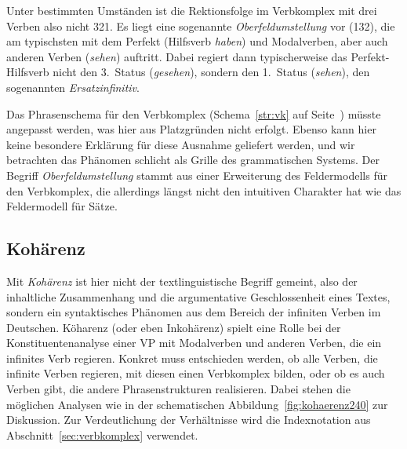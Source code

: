 Unter bestimmten Umständen ist die Rektionsfolge im Verbkomplex mit drei Verben also nicht 321.
Es liegt eine sogenannte \textit{Oberfeldumstellung} vor (132), die am typischsten mit dem Perfekt (Hilfsverb \textit{haben}) und Modalverben, aber auch anderen Verben (\zB \textit{sehen}) auftritt.
Dabei regiert dann typischerweise das Perfekt-Hilfsverb nicht den 3.~Status (\textit{gesehen}), sondern den 1.~Status (\textit{sehen}), den sogenannten \textit{Ersatzinfinitiv}.


Das Phrasenschema für den Verbkomplex (Schema~\ref{str:vk} auf Seite~\pageref{str:vk}) müsste angepasst werden, was hier aus Platzgründen nicht erfolgt.
Ebenso kann hier keine besondere Erklärung für diese Ausnahme geliefert werden, und wir betrachten das Phänomen schlicht als Grille des grammatischen Systems.
Der Begriff \textit{Oberfeldumstellung} stammt aus einer Erweiterung des Feldermodells für den Verbkomplex, die allerdings längst nicht den intuitiven Charakter hat wie das Feldermodell für Sätze.


\subsection{Kohärenz}
\label{sec:kohaerenz}


Mit \textit{Kohärenz} ist hier nicht der textlinguistische Begriff gemeint, also der inhaltliche Zusammenhang und die argumentative Geschlossenheit eines Textes, sondern ein syntaktisches Phänomen aus dem Bereich der infiniten Verben im Deutschen.
Köharenz (oder eben Inkohärenz) spielt eine Rolle bei der Konstituentenanalyse einer VP mit Modalverben und anderen Verben, die ein infinites Verb regieren.
Konkret muss entschieden werden, ob alle Verben, die infinite Verben regieren, mit diesen einen Verbkomplex bilden, oder ob es auch Verben gibt, die andere Phrasenstrukturen realisieren.
Dabei stehen die möglichen Analysen wie in der schematischen Abbildung~\ref{fig:kohaerenz240} zur Diskussion.
Zur Verdeutlichung der Verhältnisse wird die Indexnotation aus Abschnitt~\ref{sec:verbkomplex} verwendet.


